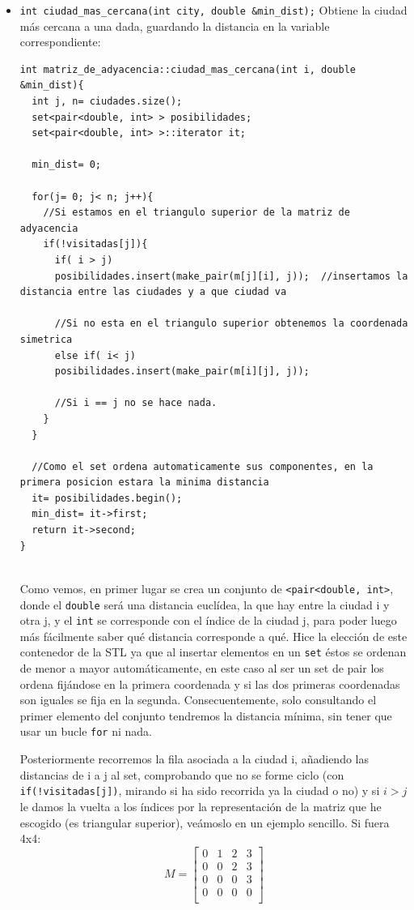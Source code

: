 \documentclass[12pt]{article}
\begin{document}
\begin{itemize}[wide, nosep, labelindent = 0pt, topsep = 1ex]
\item \verb|int ciudad_mas_cercana(int city, double &min_dist);| Obtiene la ciudad más cercana a una dada, guardando la distancia en la variable correspondiente: 

\begin{lstlisting}
int matriz_de_adyacencia::ciudad_mas_cercana(int i, double &min_dist){
  int j, n= ciudades.size();
  set<pair<double, int> > posibilidades;
  set<pair<double, int> >::iterator it;

  min_dist= 0;

  for(j= 0; j< n; j++){
    //Si estamos en el triangulo superior de la matriz de adyacencia
    if(!visitadas[j]){
      if( i > j)
      posibilidades.insert(make_pair(m[j][i], j));  //insertamos la distancia entre las ciudades y a que ciudad va

      //Si no esta en el triangulo superior obtenemos la coordenada simetrica
      else if( i< j)
      posibilidades.insert(make_pair(m[i][j], j));

      //Si i == j no se hace nada.
    }
  }

  //Como el set ordena automaticamente sus componentes, en la primera posicion estara la minima distancia
  it= posibilidades.begin();
  min_dist= it->first;
  return it->second;
}


\end{lstlisting}
 Como vemos, en primer lugar se crea un conjunto de \verb|<pair<double, int>|, donde el \verb|double| será una distancia euclídea, la que hay entre la ciudad i y otra j, y el \verb|int| se corresponde con el índice de la ciudad j, para poder luego más fácilmente saber qué distancia corresponde a qué. Hice la elección de este contenedor de la STL ya que al insertar elementos en un \verb|set| éstos se ordenan de menor a mayor automáticamente, en este caso al ser un set de pair los ordena fijándose en la primera coordenada y si las dos primeras coordenadas son iguales se fija en la segunda. Consecuentemente, solo consultando el primer elemento del conjunto tendremos la distancia mínima, sin tener que usar un bucle \verb|for| ni nada.

Posteriormente recorremos la fila asociada a la ciudad i, añadiendo las distancias de i a j al set, comprobando que no se forme ciclo (con \verb|if(!visitadas[j])|, mirando si ha sido recorrida ya la ciudad o no) y si $i>j$ le damos la vuelta a los índices por la representación de la matriz que he escogido (es triangular superior), veámoslo en un ejemplo sencillo. Si fuera 4x4: 
\[
   M=
  \left[ {\begin{array}{cccc}
   0 & 1 & 2 & 3 \\
   0 & 0 & 2 & 3 \\
   0 & 0 & 0 & 3 \\
   0 & 0 & 0 & 0 \\
  \end{array} } \right]
\]



\end{itemize}
\end{document}
